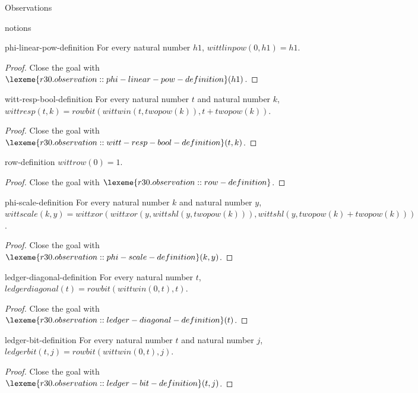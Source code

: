 \begin{lexlean}{Observations}
\begin{section}{notions}
\begin{lemma}{phi-linear-pow-definition}
For every natural number \(h1\), \(wittlinpow(0, h1) = h1\).
\begin{proof}
Close the goal with \(\lexeme{r30.observation::phi-linear-pow-definition}(h1)\).
\end{proof}
\end{lemma}

\begin{lemma}{witt-resp-bool-definition}
For every natural number \(t\) and natural number \(k\), \(wittresp(t, k) = rowbit(wittwin(t, twopow(k)), t + twopow(k))\).
\begin{proof}
Close the goal with \(\lexeme{r30.observation::witt-resp-bool-definition}(t, k)\).
\end{proof}
\end{lemma}

\begin{lemma}{row-definition}
\(wittrow(0) = 1\).
\begin{proof}
Close the goal with \(\lexeme{r30.observation::row-definition}\).
\end{proof}
\end{lemma}

\begin{lemma}{phi-scale-definition}
For every natural number \(k\) and natural number \(y\), \(wittscale(k, y) = wittxor(wittxor(y, wittshl(y, twopow(k))), wittshl(y, twopow(k) + twopow(k)))\).
\begin{proof}
Close the goal with \(\lexeme{r30.observation::phi-scale-definition}(k, y)\).
\end{proof}
\end{lemma}

\begin{lemma}{ledger-diagonal-definition}
For every natural number \(t\), \(ledgerdiagonal(t) = rowbit(wittwin(0, t), t)\).
\begin{proof}
Close the goal with \(\lexeme{r30.observation::ledger-diagonal-definition}(t)\).
\end{proof}
\end{lemma}

\begin{lemma}{ledger-bit-definition}
For every natural number \(t\) and natural number \(j\), \(ledgerbit(t, j) = rowbit(wittwin(0, t), j)\).
\begin{proof}
Close the goal with \(\lexeme{r30.observation::ledger-bit-definition}(t, j)\).
\end{proof}
\end{lemma}


\end{section}
\end{lexlean}
